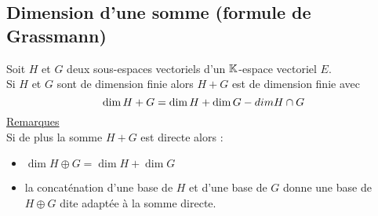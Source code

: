 \subsection{Dimension d’une somme (formule de Grassmann)}
\begin{defprop}
    Soit \(H\) et \(G\) deux sous-espaces vectoriels d’un \(\mathbb{K}\)-espace vectoriel \(E\).\\
    Si \(H\) et \(G\) sont de dimension finie alors \(H + G\) est de dimension finie avec
    \[\dim H + G = \dim H + \dim G - dim H \cap G\]
    \underline{Remarques}\\
    Si de plus la somme \(H + G\) est directe alors :
    \begin{itemize}
        \item \(\dim H \oplus G = \dim H + \dim G\) 
        \item la concaténation d’une base de \(H\) et d’une base de \(G\) donne une base de \(H \oplus G\) dite adaptée à la somme directe.
    \end{itemize}
        
\end{defprop}

